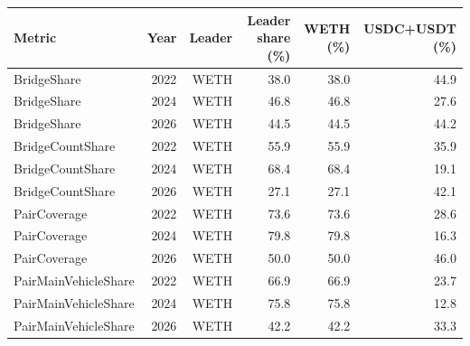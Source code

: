 \begin{tabular}{lrrrrr}
\toprule
Metric & Year & Leader & Leader share (\%) & WETH (\%) & USDC+USDT (\%) \\
\midrule
BridgeShare & 2022 & WETH & 38.0 & 38.0 & 44.9 \\
BridgeShare & 2024 & WETH & 46.8 & 46.8 & 27.6 \\
BridgeShare & 2026 & WETH & 44.5 & 44.5 & 44.2 \\
BridgeCountShare & 2022 & WETH & 55.9 & 55.9 & 35.9 \\
BridgeCountShare & 2024 & WETH & 68.4 & 68.4 & 19.1 \\
BridgeCountShare & 2026 & WETH & 27.1 & 27.1 & 42.1 \\
PairCoverage & 2022 & WETH & 73.6 & 73.6 & 28.6 \\
PairCoverage & 2024 & WETH & 79.8 & 79.8 & 16.3 \\
PairCoverage & 2026 & WETH & 50.0 & 50.0 & 46.0 \\
PairMainVehicleShare & 2022 & WETH & 66.9 & 66.9 & 23.7 \\
PairMainVehicleShare & 2024 & WETH & 75.8 & 75.8 & 12.8 \\
PairMainVehicleShare & 2026 & WETH & 42.2 & 42.2 & 33.3 \\
\bottomrule
\end{tabular}
